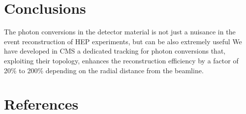 \documentclass[a4paper]{jpconf}
\def\Journal#1#2#3#4{{#1} {\bf #2}, #3 (#4)}
\begin{document}
\section{Conclusions}
\label{section_conclusions}

The photon conversions in the detector material is not just a nuisance in the event reconstruction of HEP experiments, but can be also extremely useful 
We have developed in CMS	a dedicated tracking for photon  conversions that,
exploiting their topology, enhances the reconstruction efficiency by a factor of 20\% to 200\% depending on the radial distance from the beamline.

\section*{References}

{}

%
%
\end{document}
